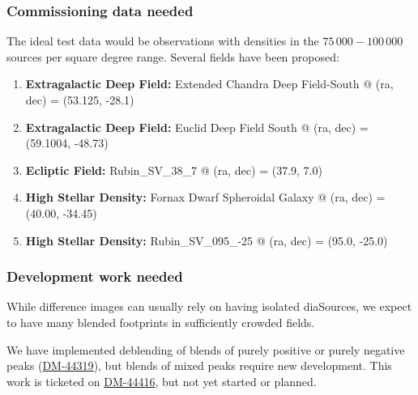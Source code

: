 \subsubsection{Commissioning data needed}
The ideal test data would be observations with densities in the \( 75\,000 - 100\,000 \) sources per square degree range. Several fields have been proposed:
\begin{enumerate}
\item \textbf{Extragalactic Deep Field:} Extended Chandra Deep Field-South @ (ra, dec) = (53.125, -28.1)
\item \textbf{Extragalactic Deep Field:} Euclid Deep Field South @ (ra, dec) = (59.1004, -48.73)
\item \textbf{Ecliptic Field:} Rubin\_SV\_38\_7 @ (ra, dec) = (37.9, 7.0)
\item \textbf{High Stellar Density:} Fornax Dwarf Spheroidal Galaxy @ (ra, dec) = (40.00, -34.45)
\item \textbf{High Stellar Density:} Rubin\_SV\_095\_-25 @ (ra, dec) = (95.0, -25.0)
\end{enumerate}

\subsubsection{Development work needed}
While difference images can usually rely on having isolated diaSources, we expect to have many blended footprints in sufficiently crowded fields. 

We have implemented deblending of blends of purely positive or purely negative peaks (\href{https://rubinobs.atlassian.net/browse/DM-44319}{DM-44319}), but blends of mixed peaks require new development.
This work is ticketed on \href{https://rubinobs.atlassian.net/browse/DM-44416}{DM-44416}, but not yet started or planned.
